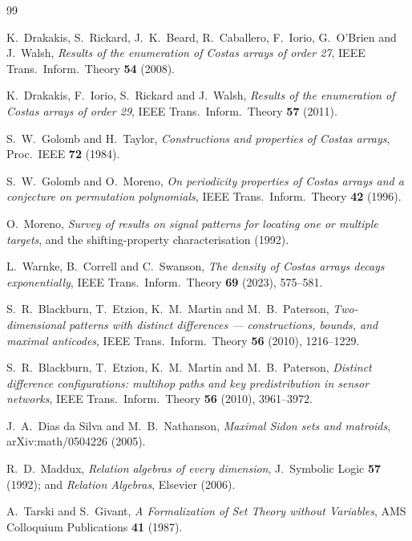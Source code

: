 \documentclass[11pt,a4paper]{article}
\theoremstyle{definition}
\begin{document}
\begin{thebibliography}{99}

 K.~Drakakis, S.~Rickard, J.~K.~Beard, R.~Caballero,
F.~Iorio, G.~O'Brien and J.~Walsh, \emph{Results of the enumeration of Costas
arrays of order 27}, IEEE Trans.\ Inform.\ Theory \textbf{54} (2008).

 K.~Drakakis, F.~Iorio, S.~Rickard and J.~Walsh,
\emph{Results of the enumeration of Costas arrays of order 29}, IEEE Trans.\
Inform.\ Theory \textbf{57} (2011).

 S.~W.~Golomb and H.~Taylor, \emph{Constructions and
properties of Costas arrays}, Proc.\ IEEE \textbf{72} (1984).

 S.~W.~Golomb and O.~Moreno, \emph{On periodicity
properties of Costas arrays and a conjecture on permutation polynomials}, IEEE
Trans.\ Inform.\ Theory \textbf{42} (1996).

 O.~Moreno, \emph{Survey of results on signal patterns for
locating one or multiple targets}, and the shifting-property characterisation
(1992).

 L.~Warnke, B.~Correll and C.~Swanson, \emph{The density of
Costas arrays decays exponentially}, IEEE Trans.\ Inform.\ Theory \textbf{69}
(2023), 575--581.

 S.~R.~Blackburn, T.~Etzion, K.~M.~Martin and M.~B.~Paterson,
\emph{Two-dimensional patterns with distinct differences --- constructions,
bounds, and maximal anticodes}, IEEE Trans.\ Inform.\ Theory \textbf{56} (2010),
1216--1229.

 S.~R.~Blackburn, T.~Etzion, K.~M.~Martin and M.~B.~Paterson,
\emph{Distinct difference configurations: multihop paths and key predistribution
in sensor networks}, IEEE Trans.\ Inform.\ Theory \textbf{56} (2010),
3961--3972.

 J.~A.~Dias da Silva and M.~B.~Nathanson, \emph{Maximal Sidon sets
and matroids}, arXiv:math/0504226 (2005).

 R.~D.~Maddux, \emph{Relation algebras of every dimension},
J.~Symbolic Logic \textbf{57} (1992); and \emph{Relation Algebras}, Elsevier
(2006).

 A.~Tarski and S.~Givant, \emph{A Formalization of Set
Theory without Variables}, AMS Colloquium Publications \textbf{41} (1987).


\end{thebibliography}
\end{document}
